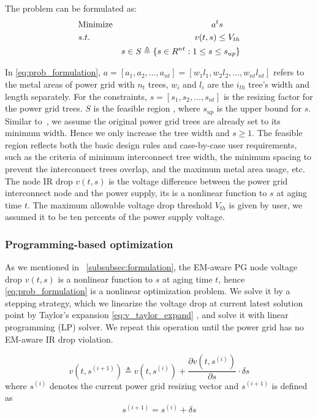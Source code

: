 The problem can be formulated as:
\begin{align}
	\label{eq:prob_formulation}
	&\mbox{Minimize}  & a^{t}s \qquad   \notag  \\
	&s.t.     & v(t,s)\leq V_{th} \\
	& \quad   &s \in S   \triangleq \{ s \in R^{nt}: 1 \leq s \leq s_{up} \}        \notag
\end{align}

In \eqref{eq:prob_formulation}, $a=[a_{1},a_{2},\ldots,a_{nt}] = [w_{1}l_{1},w_{2}l_{2},\ldots,w_{nt}l_{nt}]$ refers to the metal areas of power grid with $n_{t}$ trees, $w_{i}$ and $l_{i}$ are the $i_{th}$ tree's width and length separately.
For the constraints, $s=[s_{1},s_{2},\ldots,s_{nt}]$  is the resizing factor for the power grid trees. $S$ is the feasible region ,
where $s_{up}$ is the upper bound for $s$. Similar to~\cite{Sukharev:2019pg}, we assume the original power grid trees are already set to its minimum width. Hence we only increase the tree width and $s \geq 1 $.
The feasible region reflects both the basic design rules and case-by-case user requirements, such as the criteria of minimum interconnect tree width, the minimum spacing to prevent the  interconnect trees overlap, and the maximum metal area usage, etc. 
The node IR drop $v(t,s)$  is the voltage difference between the power grid interconnect node and the power supply, its is a nonlinear function to $s$ at aging time $t$. The maximum allowable voltage drop threshold $V_{th}$ is given by user, we assumed it to be ten percents of the power supply voltage.


\subsubsection{Programming-based optimization}
\label{subsubsec:slp_framework}

As we mentioned in ~\ref{subsubsec:formulation}, the EM-aware PG node voltage drop $v(t,s)$ is a nonlinear function to $s$ at aging time $t$, hence \eqref{eq:prob_formulation} is a nonlinear optimization problem. 
We solve it by a stepping strategy, which we linearize the voltage drop at current latest solution point by Taylor's expansion \eqref{eq:v_taylor_expand} , and solve it with linear programming (LP) solver. We repeat this operation until the power grid has no EM-aware IR drop violation.

\begin{equation}
	\label{eq:v_taylor_expand}
	v(t, s^{(i+1)}) \triangleq v(t,s^{(i)}) + \dfrac{\partial v(t, s^{(i)})}{\partial s} \cdot \delta s
\end{equation}
where $s^{(i)}$ denotes the current power grid resizing vector and $s^{(i+1)}$ is defined as 
\begin{equation}
	\label{eq:s}
	s^{(i+1)} = s^{(i)} + \delta s 
\end{equation}

